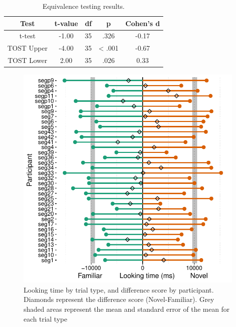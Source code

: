 \documentclass[man,floatsintext]{apa6}
\begin{document}
\begin{table}[tbp]
\begin{center}
\begin{threeparttable}
\caption{\label{tab:tost}Equivalence testing results.}
\begin{tabular}{ccccc}
\toprule
Test & t-value & df & p & Cohen's d\\
\midrule
t-test & -1.00 & 35 & .326 & -0.17\\
TOST Upper & -4.00 & 35 & < .001 & -0.67\\
TOST Lower & 2.00 & 35 & .026 & 0.33\\
\bottomrule
\end{tabular}
\end{threeparttable}
\end{center}
\end{table}

\begin{figure}
\centering
\includegraphics{segmentation_manuscript_files/figure-latex/unnamed-chunk-2-1.pdf}
\caption{\label{fig:unnamed-chunk-2}Looking time by trial type, and difference score by participant. Diamonds represent the difference score (Novel-Familiar). Grey shaded areas represent the mean and standard error of the mean for each trial type}
\end{figure}
\end{document}
